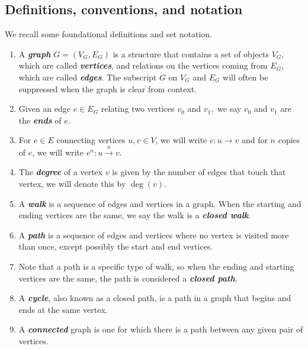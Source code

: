 \documentclass{amsart}
\theoremstyle{definition}
\theoremstyle{plain}
\numberwithin{theorem}{section}
\numberwithin{equation}{section}
\numberwithin{figure}{section}
\newcommand{\0}{\langle 0 \rangle }
\begin{document}
\subsection{Definitions, conventions, and notation} \label{sec:notation}
We recall some foundational definitions and set notation.

\begin{enumerate}
    \item A \textbf{\textit{graph}} $G=(V_G,E_G)$ is a structure that contains a set of objects $V_G$, which are called \textbf{\textit{vertices}}, and relations on the vertices coming from $E_G$, which are called \textbf{\textit{edges}}. The subscript $G$ on $V_G$ and $E_G$ will often be suppressed when the graph is clear from context.

    \item Given an edge $e \in E_G$ relating two vertices $v_0$ and $v_1,$ we say $v_0$ and $v_1$ are the \textbf{\textit{ends}} of $e$. 

    \item For $e\in E$ connecting vertices $u,v\in V$, we will write $e\colon u\to v$ and for $n$ copies of $e$, we will write $e^n\colon u\xrightarrow{n} v$. 

    \item The \textbf{\textit{degree}} of a vertex $v$ is given by the number of edges that touch that vertex, we will denote this by $\deg(v)$. 

    \item A \textbf{\textit{walk}} is a sequence of edges and vertices in a graph. When the starting and ending vertices are the same, we say the walk is a \textbf{\textit{closed walk}}.

    \item  A \textbf{\textit{path}} is a sequence of edges and vertices where no vertex is visited more than once, except possibly the start and end vertices. 

    \item Note that a path is a specific type of walk, so when the ending and starting vertices are the same, the path is considered a \textbf{\textit{closed path}}.

    \item A \textbf{\textit{cycle}}, also known as a closed path, is a path in a graph that begins and ends at the same vertex. 

    \item  A \textbf{\textit{connected}} graph is one for which there is a path between any given pair of vertices. 


\end{enumerate}
\end{document}

